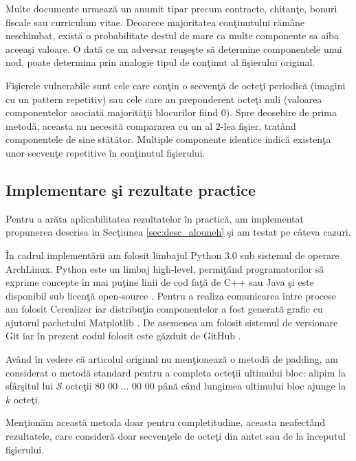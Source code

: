 \documentclass{llncs}
\begin{document}
Multe documente urmeaz\u{a} un anumit tipar precum contracte, chitan\c{t}e, bonuri fiscale sau curriculum vitae. Deoarece majoritatea con\c{t}inutului r\u{a}m\^{a}ne neschimbat, exist\u{a} o probabilitate destul de mare ca multe componente sa aiba aceea\c{s}i valoare. O dat\u{a} ce un adversar reu\c{s}e\c{s}te s\u{a} determine componentele unui nod, poate determina prin analogie tipul de con\c{t}inut al fi\c{s}ierului original.

Fi\c{s}ierele vulnerabile sunt cele care con\c{t}in o secven\c{t}\u{a} de octe\c{t}i periodic\u{a} (imagini cu un pattern repetitiv) sau cele care au preponderent octe\c{t}i nuli (valoarea componentelor asociat\u{a} majorit\u{a}\c{t}ii blocurilor fiind $0$). Spre deosebire de prima metod\u{a}, aceasta nu necesit\u{a} compararea cu un al $2$-lea fi\c{s}ier, trat\^{a}nd componentele de sine st\u{a}t\u{a}tor. Multiple componente identice indic\u{a} existen\c{t}a unor secven\c{t}e repetitive \^{i}n con\c{t}inutul fi\c{s}ierului.

\subsection{Implementare \c{s}i rezultate practice}
Pentru a ar\u{a}ta aplicabilitatea rezultatelor \^{i}n practic\u{a}, am implementat propunerea descrisa in Sec\c{t}iunea {\ref{sec:desc_alouneh}} \c{s}i am testat pe c\^{a}teva cazuri.

\^{I}n cadrul implement\u{a}rii am folosit limbajul Python 3.0 sub sistemul de operare ArchLinux. Python este un limbaj high-level, permi\c{t}\^{a}nd programatorilor s\u{a} exprime concepte \^{i}n mai pu\c{t}ine linii de cod fa\c{t}\u{a} de C++ sau Java \c{s}i este disponibil sub licen\c{t}\u{a} open-source \cite{Python:2015}.
Pentru a realiza comunicarea \^{i}ntre procese am folosit Cerealizer iar distribu\c{t}ia componentelor a fost generat\u{a} grafic cu ajutorul pachetului Matplotlib \cite{Hunter:2007, PyCerealizer:2015}. De asemenea am folosit sistemul de versionare Git iar \^{i}n prezent codul folosit este g\u{a}zduit de GitHub \cite{Github:2015, CodeGit:2015}.

Av\^{a}nd \^{i}n vedere c\u{a} articolul original nu men\c{t}ioneaz\u{a} o metod\u{a} de padding, am considerat o metod\u{a} standard pentru a completa octe\c{t}ii ultimului bloc: alipim la sf\^{a}r\c{s}itul lui $\mathcal{S}$ octe\c{t}ii $80$ $00$ $\dots$ $00$ $00$ p\^{a}n\u{a} c\^{a}nd lungimea ultimului bloc ajunge la $k$ octe\c{t}i.

Men\c{t}ion\u{a}m aceast\u{a} metoda doar pentru completitudine, aceasta neafect\^{a}nd rezultatele, care consider\u{a} doar secven\c{t}ele de octe\c{t}i din antet sau de la \^{i}nceputul fi\c{s}ierului.
\end{document}
